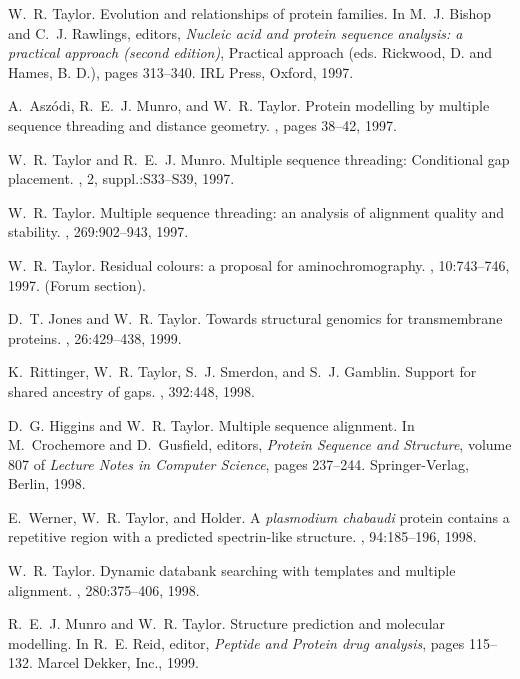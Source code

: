 \begin{thebibliography}{100}
W.~R. Taylor.
\newblock Evolution and relationships of protein families.
\newblock In M.~J. Bishop and C.~J. Rawlings, editors, {\em Nucleic acid and
  protein sequence analysis: a practical approach (second edition)}, Practical
  approach (eds. Rickwood, D. and Hames, B. D.), pages 313--340. IRL Press,
  Oxford, 1997.

A.~Asz\'{o}di, R.~E.~J. Munro, and W.~R. Taylor.
\newblock Protein modelling by multiple sequence threading and distance
  geometry.
, pages 38--42, 1997.

W.~R. Taylor and R.~E.~J. Munro.
\newblock Multiple sequence threading: Conditional gap placement.
, 2, suppl.:S33--S39, 1997.

W.~R. Taylor.
\newblock Multiple sequence threading: an analysis of alignment quality and
  stability.
, 269:902--943, 1997.

W.~R. Taylor.
\newblock Residual colours: a proposal for aminochromography.
, 10:743--746, 1997.
\newblock (Forum section).

D.~T. Jones and W.~R. Taylor.
\newblock Towards structural genomics for transmembrane proteins.
, 26:429--438, 1999.

K.~Rittinger, W.~R. Taylor, S.~J. Smerdon, and S.~J. Gamblin.
\newblock Support for shared ancestry of gaps.
, 392:448, 1998.

D.~G. Higgins and W.~R. Taylor.
\newblock Multiple sequence alignment.
\newblock In M.~Crochemore and D.~Gusfield, editors, {\em Protein Sequence and
  Structure}, volume 807 of {\em Lecture Notes in Computer Science}, pages
  237--244. Springer-Verlag, Berlin, 1998.

E.~Werner, W.~R. Taylor, and Holder.
\newblock A {\em {p}lasmodium chabaudi} protein contains a repetitive region
  with a predicted spectrin-like structure.
, 94:185--196, 1998.

W.~R. Taylor.
\newblock Dynamic databank searching with templates and multiple alignment.
, 280:375--406, 1998.

R.~E.~J. Munro and W.~R. Taylor.
\newblock Structure prediction and molecular modelling.
\newblock In R.~E. Reid, editor, {\em Peptide and Protein drug analysis}, pages
  115--132. Marcel Dekker, Inc., 1999.


\end{thebibliography}
